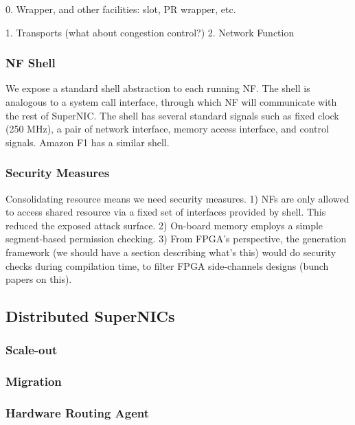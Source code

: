 0. Wrapper, and other facilities: slot, PR wrapper, etc.

1. Transports (what about congestion control?)
2. Network Function

\subsubsection{NF Shell}
We expose a standard shell abstraction to each running NF.
The shell is analogous to a system call interface,
through which NF will communicate with the rest of SuperNIC.
The shell has several standard signals such as fixed clock (250 MHz),
a pair of network interface, memory access interface, and control signals. Amazon F1 has a similar shell.
\fi

\subsubsection{Security Measures}
Consolidating resource means we need security measures.
1) NFs are only allowed to access shared resource via a fixed set of interfaces provided by shell. This reduced the exposed attack surface.
2) On-board memory employs a simple segment-based permission checking.
3) From FPGA's perspective, the generation framework (we should have a section describing what's this) would do security checks during compilation time, to filter FPGA side-channels designs (bunch papers on this).

\subsection{Distributed SuperNICs}

\subsubsection{Scale-out}
\subsubsection{Migration}
\subsubsection{Hardware Routing Agent}

